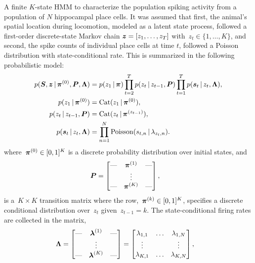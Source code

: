 A finite $K$-state HMM to characterize the population spiking activity
from a population of $N$ hippocampal place cells.  It was assumed that
first, the animal's spatial location during locomotion, modeled as a
latent state process, followed a first-order discrete-state Markov
chain ${\boldsymbol{z} = \left[ z_1, \ldots, z_T\right]}$
with~$z_t \in \{1, \ldots, K\}$, and second, the spike counts of
individual place cells at time $t$, followed a Poisson distribution
with state-conditional rate. This is summarized in the following
probabilistic model:
\begin{align}
  p(\boldsymbol{S}, \boldsymbol{z} \,|\, \boldsymbol{\pi}^{(0)}, \boldsymbol{P}, \boldsymbol{\Lambda}) 
  &= p(z_1\,|\, \boldsymbol{\pi}) \prod_{t=2}^T p(z_t \,|\, z_{t-1}, \boldsymbol{P}) 
    \prod_{t=1}^T p(\boldsymbol{s}_t \,|\, z_t, \boldsymbol{\Lambda}),\\
  \nonumber 
  p(z_1 \,|\, \boldsymbol{\pi}^{(0)}) &= \mathrm{Cat}(z_1 \,|\, \boldsymbol{\pi}^{(0)}), \\
  \nonumber 
  p(z_t \,|\, z_{t-1}, \boldsymbol{P}) &= \mathrm{Cat}(z_t \,|\, \boldsymbol{\pi}^{(z_{t-1})}), \\
  \nonumber 
  p(\boldsymbol{s}_t \,|\, z_t, \boldsymbol{\Lambda}) &= \prod_{n=1}^N \mathrm{Poisson}(s_{t,n} \,|\, \lambda_{z_t,n}).
\end{align}
where~$\boldsymbol{\pi}^{(0)} \in [0,1]^K$ is a discrete probability distribution over
initial states, and
\begin{align*}
  \boldsymbol{P} &=
        \begin{bmatrix}
          \text{---} &  \boldsymbol{\pi}^{(1)}  & \text{---} \\
            &  \vdots &   \\
          \text{---} &  \boldsymbol{\pi}^{(K)}  & \text{---}
        \end{bmatrix},
\end{align*}
is a~${K \times K}$ transition matrix where the row,~${\boldsymbol{\pi}^{(k)} \in
  [0,1]^K}$, specifies a discrete conditional distribution over~$z_t$
given~${z_{t-1}=k}$. 
The state-conditional firing rates are collected in the matrix,
\begin{align*}
  \boldsymbol{\Lambda} 
  &=
    \begin{bmatrix}
      \text{---} &  \boldsymbol{\lambda}^{(1)}  & \text{---} \\
      &  \vdots &   \\
      \text{---} &  \boldsymbol{\lambda}^{(K)}  & \text{---}
    \end{bmatrix}
   =
    \begin{bmatrix}
      \lambda_{1,1} & \ldots  & \lambda_{1,N}  \\
      \vdots        &         & \vdots  \\
      \lambda_{K,1} &  \ldots & \lambda_{K,N} 
    \end{bmatrix}, 
\end{align*}

